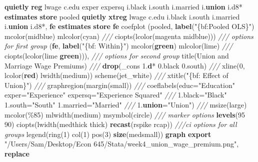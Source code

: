 \documentclass[
]{book}
\newenvironment{Shaded}{\begin{snugshade}}{\end{snugshade}}
\newcommand{\BaseNTok}[1]{\textcolor[rgb]{0.00,0.00,0.81}{#1}}
\newcommand{\CommentTok}[1]{\textcolor[rgb]{0.56,0.35,0.01}{\textit{#1}}}
\newcommand{\DataTypeTok}[1]{\textcolor[rgb]{0.13,0.29,0.53}{#1}}
\newcommand{\DecValTok}[1]{\textcolor[rgb]{0.00,0.00,0.81}{#1}}
\newcommand{\KeywordTok}[1]{\textcolor[rgb]{0.13,0.29,0.53}{\textbf{#1}}}
\newcommand{\NormalTok}[1]{#1}
\newcommand{\StringTok}[1]{\textcolor[rgb]{0.31,0.60,0.02}{#1}}
\begin{document}
\begin{Shaded}
\begin{Highlighting}[]
\KeywordTok{quietly} \KeywordTok{reg}\NormalTok{ lwage c.edu exper expersq i.}\BaseNTok{black}\NormalTok{ i.south i.married i.}\KeywordTok{union}\NormalTok{ i.d8*}
\KeywordTok{estimates} \KeywordTok{store}\NormalTok{ pooled}
\KeywordTok{quietly} \KeywordTok{xtreg}\NormalTok{ lwage c.edu i.}\BaseNTok{black}\NormalTok{ i.south i.married i.}\KeywordTok{union}\NormalTok{ i.d8*, }\KeywordTok{fe}
\KeywordTok{estimates} \KeywordTok{store} \KeywordTok{fe}
\NormalTok{coefplot (pooled, }\KeywordTok{label}\NormalTok{(}\StringTok{"\{bf:Pooled OLS\}"}\NormalTok{) mcolor(}\BaseNTok{midblue}\NormalTok{) mlcolor(}\BaseNTok{cyan}\NormalTok{) }\CommentTok{///}
\NormalTok{      ciopts(lcolor(}\BaseNTok{magenta} \BaseNTok{midblue}\NormalTok{))) }\CommentTok{/// options for first group}
\NormalTok{      (}\KeywordTok{fe}\NormalTok{, }\KeywordTok{label}\NormalTok{(}\StringTok{"\{bf: Within\}"}\NormalTok{) mcolor(}\KeywordTok{green}\NormalTok{) mlcolor(}\BaseNTok{lime}\NormalTok{) }\CommentTok{///}
\NormalTok{      ciopts(lcolor(}\BaseNTok{lime} \KeywordTok{green}\NormalTok{))), }\CommentTok{/// options for second group}
      \BaseNTok{title}\NormalTok{(Union and Marriage Wage Premiums) }\CommentTok{///}
      \KeywordTok{drop}\NormalTok{(}\DataTypeTok{\_cons}\NormalTok{ 1.}\KeywordTok{d}\NormalTok{* 0.}\BaseNTok{black}\NormalTok{ 0.south) }\CommentTok{///}
      \BaseNTok{xline}\NormalTok{(0, lcolor(}\KeywordTok{red}\NormalTok{) lwidth(medium)) }\DecValTok{scheme}\NormalTok{(jet\_white) }\CommentTok{///}
      \BaseNTok{xtitle}\NormalTok{(}\StringTok{"\{bf: Effect of Union\}"}\NormalTok{) }\CommentTok{///}
\NormalTok{      graphregion(}\BaseNTok{margin}\NormalTok{(small)) }\CommentTok{///}
\NormalTok{      coeflabels(educ=}\StringTok{"Education"}\NormalTok{ exper=}\StringTok{"Experience"}\NormalTok{ expersq=}\StringTok{"Experience Squared"} \CommentTok{///}
\NormalTok{      1.}\BaseNTok{black}\NormalTok{=}\StringTok{"Black"}\NormalTok{ 1.south=}\StringTok{"South"}\NormalTok{ 1.married=}\StringTok{"Married"} \CommentTok{///}
\NormalTok{      1.}\KeywordTok{union}\NormalTok{=}\StringTok{"Union"}\NormalTok{) }\CommentTok{///}
\NormalTok{      msize(large) mcolor(\%85) mlwidth(medium) }\BaseNTok{msymbol}\NormalTok{(}\BaseNTok{circle}\NormalTok{) }\CommentTok{/// marker options}
      \KeywordTok{levels}\NormalTok{(95 90) ciopts(lwidth(}\BaseNTok{medthick}\NormalTok{ thick) }\KeywordTok{recast}\NormalTok{(rspike rcap)) }\CommentTok{///ci options for all groups}
      \BaseNTok{legend}\NormalTok{(}\BaseNTok{ring}\NormalTok{(1) col(1) pos(3) }\KeywordTok{size}\NormalTok{(medsmall))}
      \KeywordTok{graph} \KeywordTok{export} \StringTok{"/Users/Sam/Desktop/Econ 645/Stata/week4\_union\_wage\_premium.png"}\NormalTok{, }\KeywordTok{replace}
\end{Highlighting}
\end{Shaded}
\end{document}
